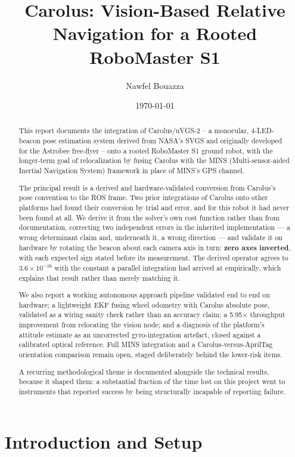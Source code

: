 \documentclass[11pt]{article}
\title{Carolus: Vision-Based Relative Navigation for a Rooted RoboMaster S1}
\author{Nawfel Bouazza}
\date{\today}
\begin{document}
\maketitle

\begin{abstract}
This report documents the integration of Carolus/uVGS-2 -- a monocular,
4-LED-beacon pose estimation system derived from NASA's SVGS and originally
developed for the Astrobee free-flyer -- onto a rooted RoboMaster S1 ground
robot, with the longer-term goal of relocalization by fusing Carolus with
the MINS (Multi-sensor-aided Inertial Navigation System) framework in place
of MINS's GPS channel.

The principal result is a derived and hardware-validated conversion from
Carolus's pose convention to the ROS frame. Two prior integrations of
Carolus onto other platforms had found their conversion by trial and error,
and for this robot it had never been found at all. We derive it from the
solver's own cost function rather than from documentation, correcting two
independent errors in the inherited implementation --- a wrong determinant
claim and, underneath it, a wrong direction --- and validate it on hardware
by rotating the beacon about each camera axis in turn: \textbf{zero axes
inverted}, with each expected sign stated before its measurement. The
derived operator agrees to $3.6\times10^{-16}$ with the constant a parallel
integration had arrived at empirically, which explains that result rather
than merely matching it.

We also report a working autonomous approach pipeline validated end to end
on hardware; a lightweight EKF fusing wheel odometry with Carolus absolute
pose, validated as a wiring sanity check rather than an accuracy claim; a
5.95$\times$ throughput improvement from relocating the vision node; and a
diagnosis of the platform's attitude estimate as an uncorrected
gyro-integration artefact, closed against a calibrated optical reference.
Full MINS integration and a Carolus-versus-AprilTag orientation comparison
remain open, staged deliberately behind the lower-risk items.

A recurring methodological theme is documented alongside the technical
results, because it shaped them: a substantial fraction of the time lost on
this project went to instruments that reported success by being structurally
incapable of reporting failure.
\end{abstract}

\section{Introduction and Setup}
\end{document}
